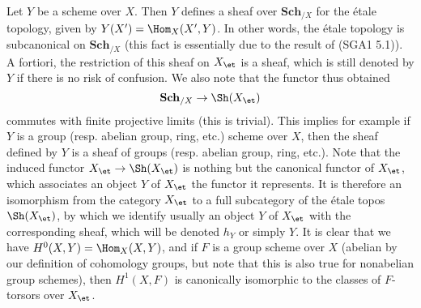 \begin{example}\label{scheme etale site subcanonical}
Let $Y$ be a scheme over $X$. Then $Y$ defines a sheaf over $\mathbf{Sch}_{/X}$ for the \'etale topology, given by $Y(X')=\Hom_X(X',Y)$. In other words, the \'etale topology is subcanonical on $\mathbf{Sch}_{/X}$ (this fact is essentially due to the result of (SGA1  5.1)). A fortiori, the restriction of this sheaf on $X_\et$ is a sheaf, which is still denoted by $Y$ if there is no risk of confusion. We also note that the functor thus obtained
\[\mathbf{Sch}_{/X}\to\Sh(X_\et)\]
commutes with finite projective limits (this is trivial). This implies for example if $Y$ is a group (resp. abelian group, ring, etc.) scheme over $X$, then the sheaf defined by $Y$ is a sheaf of groups (resp. abelian group, ring, etc.). Note that the induced functor $X_\et\to\Sh(X_\et)$ is nothing but the canonical functor of $X_\et$, which associates an object $Y$ of $X_\et$ the functor it represents. It is therefore an isomorphism from the category $X_\et$ to a full subcategory of the \'etale topos $\Sh(X_\et)$, by which we identify usually an object $Y$ of $X_\et$ with the corresponding sheaf, which will be denoted $h_Y$ or simply $Y$. It is clear that we have $H^0(X,Y)=\Hom_X(X,Y)$, and if $F$ is a group scheme over $X$ (abelian by our definition of cohomology groups, but note that this is also true for nonabelian group schemes), then $H^1(X,F)$ is canonically isomorphic to the classes of $F$-torsors over $X_\et$.
\end{example}

